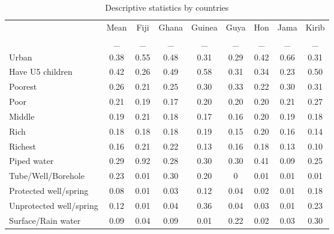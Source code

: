 \begin{table}[htbp]\centering
\def\sym#1{\ifmmode^{#1}\else\(^{#1}\)\fi}
\caption{Descriptive statistics by countries \label{Outside}}
\begin{tabular}{l*{8}{c}}
\hline\hline
                    &\multicolumn{1}{c}{Mean}&\multicolumn{1}{c}{Fiji}&\multicolumn{1}{c}{Ghana}&\multicolumn{1}{c}{Guinea}&\multicolumn{1}{c}{Guya}&\multicolumn{1}{c}{Hon}&\multicolumn{1}{c}{Jama}&\multicolumn{1}{c}{Kirib}\\
                    &           _&           _&           _&           _&           _&           _&           _&           _\\
\hline
Urban               &        0.38&        0.55&        0.48&        0.31&        0.29&        0.42&        0.66&        0.31\\
Have U5 children    &        0.42&        0.26&        0.49&        0.58&        0.31&        0.34&        0.23&        0.50\\
Poorest             &        0.26&        0.21&        0.25&        0.30&        0.33&        0.22&        0.30&        0.31\\
Poor                &        0.21&        0.19&        0.17&        0.20&        0.20&        0.20&        0.21&        0.27\\
Middle              &        0.19&        0.21&        0.18&        0.17&        0.16&        0.20&        0.19&        0.18\\
Rich                &        0.18&        0.18&        0.18&        0.19&        0.15&        0.20&        0.16&        0.14\\
Richest             &        0.16&        0.21&        0.22&        0.13&        0.16&        0.18&        0.13&        0.10\\
Piped water         &        0.29&        0.92&        0.28&        0.30&        0.30&        0.41&        0.09&        0.25\\
Tube/Well/Borehole  &        0.23&        0.01&        0.30&        0.20&        0&        0.01&        0.01&        0.01\\
Protected well/spring&        0.08&        0.01&        0.03&        0.12&        0.04&        0.02&        0.01&        0.18\\
Unprotected well/spring&        0.12&        0.01&        0.04&        0.36&        0.04&        0.03&        0.01&        0.23\\
Surface/Rain water  &        0.09&        0.04&        0.09&        0.01&        0.22&        0.02&        0.03&        0.30\\

\end{tabular}
\end{table}
